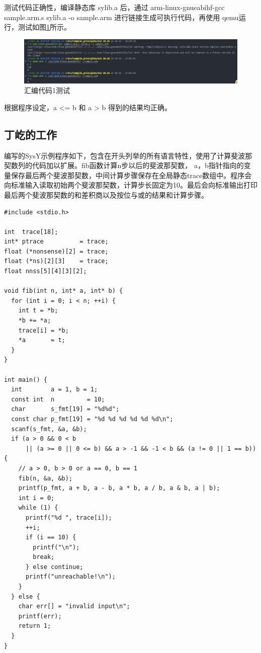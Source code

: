 \documentclass[UTF8,a4paper,10pt]{ctexart}
\begin{document}
测试代码正确性，编译静态库 sylib.a 后，通过 arm-linux-gnueabihf-gcc sample.arm.s sylib.a -o sample.arm 进行链接生成可执行代码，再使用 qemu运行，测试如图\ref{fig:1}所示。

\begin{figure}[H]
  \centering
  \includegraphics[width=1\textwidth]{figure/1.jpg}
  \caption{汇编代码1测试}
  \label{fig:1}
\end{figure}

根据程序设定，a <= b 和 a > b 得到的结果均正确。

\subsection{丁屹的工作}

编写的SysY示例程序如下，包含在开头列举的所有语言特性，使用了计算斐波那契数列的代码加以扩展。fib函数计算n步以后的斐波那契数，
a，b指针指向的变量保存最后两个斐波那契数，中间计算步骤保存在全局静态trace数组中。程序会向标准输入读取初始两个斐波那契数，计算步长固定为10。最后会向标准输出打印最后两个斐波那契数的和差积商以及按位与或的结果和计算步骤。

\begin{verbatim}
#include <stdio.h>

int  trace[18];
int* ptrace          = trace;
float (*nonsense)[2] = trace;
float (*ns)[2][3]    = trace;
float nnss[5][4][3][2];

void fib(int n, int* a, int* b) {
  for (int i = 0; i < n; ++i) {
    int t = *b;
    *b += *a;
    trace[i] = *b;
    *a       = t;
  }
}

int main() {
  int        a = 1, b = 1;
  const int  n         = 10;
  char       s_fmt[19] = "%d%d";
  const char p_fmt[19] = "%d %d %d %d %d %d\n";
  scanf(s_fmt, &a, &b);
  if (a > 0 && 0 < b
      || (a >= 0 || 0 <= b) && a > -1 && -1 < b && (a != 0 || 1 == b)) {
    // a > 0, b > 0 or a == 0, b == 1
    fib(n, &a, &b);
    printf(p_fmt, a + b, a - b, a * b, a / b, a & b, a | b);
    int i = 0;
    while (1) {
      printf("%d ", trace[i]);
      ++i;
      if (i == 10) {
        printf("\n");
        break;
      } else continue;
      printf("unreachable!\n");
    }
  } else {
    char err[] = "invalid input\n";
    printf(err);
    return 1;
  }
}
\end{verbatim}
\end{document}
